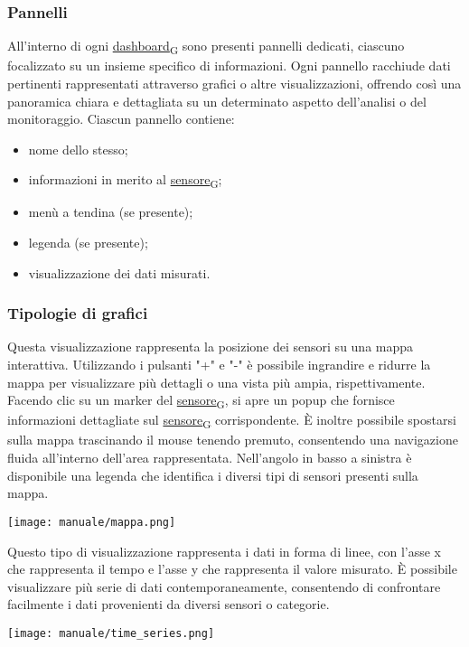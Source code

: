 \subsubsection{Pannelli}
All'interno di ogni \href{https://7last.github.io/docs/pb/documentazione-interna/glossario\#dashboard}{dashboard\textsubscript{G}} sono presenti pannelli dedicati, ciascuno focalizzato su un insieme specifico di informazioni. Ogni pannello racchiude dati pertinenti rappresentati attraverso grafici o altre visualizzazioni, offrendo così una panoramica chiara e dettagliata su un determinato aspetto dell'analisi o del monitoraggio. Ciascun pannello contiene:
\begin{itemize}
    \item nome dello stesso;
    \item informazioni in merito al \href{https://7last.github.io/docs/pb/documentazione-interna/glossario\#sensore}{sensore\textsubscript{G}};
    \item menù a tendina (se presente);
    \item legenda (se presente);
    \item visualizzazione dei dati misurati.
\end{itemize}

\subsubsection{Tipologie di grafici}
Questa visualizzazione rappresenta la posizione dei sensori su una mappa interattiva. Utilizzando i pulsanti "+" e "-" è possibile ingrandire e ridurre la mappa per visualizzare più dettagli o una vista più ampia, rispettivamente. Facendo clic su un marker del \href{https://7last.github.io/docs/pb/documentazione-interna/glossario\#sensore}{sensore\textsubscript{G}}, si apre un popup che fornisce informazioni dettagliate sul \href{https://7last.github.io/docs/pb/documentazione-interna/glossario\#sensore}{sensore\textsubscript{G}} corrispondente. È inoltre possibile spostarsi sulla mappa trascinando il mouse tenendo premuto, consentendo una navigazione fluida all'interno dell'area rappresentata. Nell'angolo in basso a sinistra è disponibile una legenda che identifica i diversi tipi di sensori presenti sulla mappa.
\begin{center}
    \texttt{[image: manuale/mappa.png]}
\end{center}

Questo tipo di visualizzazione rappresenta i dati in forma di linee, con l'asse x che rappresenta il tempo e l'asse y che rappresenta il valore misurato. È possibile visualizzare più serie di dati contemporaneamente, consentendo di confrontare facilmente i dati provenienti da diversi sensori o categorie.
\begin{center}
    \texttt{[image: manuale/time\_series.png]}
\end{center} 

